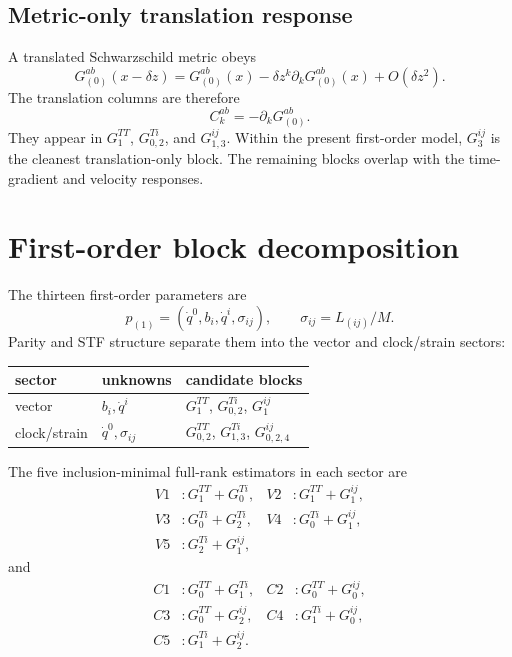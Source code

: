 \documentclass[11pt]{article}
\newcommand{\G}{G}
\begin{document}
\subsection{Metric-only translation response}

A translated Schwarzschild metric obeys
\begin{equation}
\G_{(0)}^{ab}(x-\delta z)
=\G_{(0)}^{ab}(x)
-\delta z^k\partial_k\G_{(0)}^{ab}(x)
+O(\delta z^2).
\end{equation}
The translation columns are therefore
\begin{equation}
C_k^{ab}=-\partial_k\G_{(0)}^{ab}.
\end{equation}
They appear in \(G^{TT}_{1}\), \(G^{Ti}_{0,2}\), and
\(G^{ij}_{1,3}\).  Within the present first-order model,
\(G^{ij}_{3}\) is the cleanest translation-only block.  The remaining
blocks overlap with the time-gradient and velocity responses.

\section{First-order block decomposition}

The thirteen first-order parameters are
\begin{equation}
p_{(1)}
=\left(\dot q^0,b_i,\dot q^i,\sigma_{ij}\right),
\qquad
\sigma_{ij}=L_{(ij)}/M.
\end{equation}
Parity and STF structure separate them into the vector and clock/strain
sectors:

\begin{center}
\begin{tabularx}{0.94\textwidth}{
  >{\raggedright\arraybackslash}p{}
  >{\raggedright\arraybackslash}p{}X}
\toprule
\textbf{sector} & \textbf{unknowns} & \textbf{candidate blocks}\\
\midrule
vector & \(b_i,\dot q^i\) &
\(G^{TT}_{1}\), \(G^{Ti}_{0,2}\), \(G^{ij}_{1}\)\\
clock/strain & \(\dot q^0,\sigma_{ij}\) &
\(G^{TT}_{0,2}\), \(G^{Ti}_{1,3}\), \(G^{ij}_{0,2,4}\)\\
\bottomrule
\end{tabularx}
\end{center}

The five inclusion-minimal full-rank estimators in each sector are
\begin{align*}
V1&:G^{TT}_{1}+G^{Ti}_{0},&
V2&:G^{TT}_{1}+G^{ij}_{1},\\
V3&:G^{Ti}_{0}+G^{Ti}_{2},&
V4&:G^{Ti}_{0}+G^{ij}_{1},\\
V5&:G^{Ti}_{2}+G^{ij}_{1},
\end{align*}
and
\begin{align*}
C1&:G^{TT}_{0}+G^{Ti}_{1},&
C2&:G^{TT}_{0}+G^{ij}_{0},\\
C3&:G^{TT}_{0}+G^{ij}_{2},&
C4&:G^{Ti}_{1}+G^{ij}_{0},\\
C5&:G^{Ti}_{1}+G^{ij}_{2}.
\end{align*}
\end{document}
